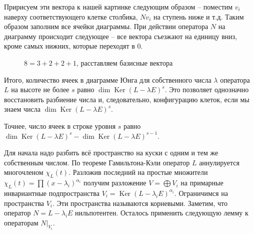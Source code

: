 \documentclass[10pt,a4paper,oneside]{book}
\theoremstyle{definition}
\DeclareMathOperator{\Ker}{Ker}
\begin{document}
 Пририсуем эти вектора к нашей картинке следующим образом -- поместим $v_i$ наверху соответствующего клетке  столбика, $N v_i$ на ступень ниже и т.д. Таким образом заполним все ячейки диаграммы. При действии оператора $N$ на диаграмму происходит следующее -- все вектора съезжают на единицу вниз, кроме самых нижних, которые переходят в $0$.
\begin{figure}[hhh]
\begin{center}
\end{center}
\caption{$8=3+2+2+1$, расставляем базисные вектора}
\end{figure}
Итого, количество ячеек в диаграмме Юнга для собственного числа $\lambda$ оператора $L$ на высоте не более $s$ равно $\dim \Ker(L - \lambda E)^s $.
Это  позволяет однозначно восстановить разбиение числа и, следовательно, конфигурацию клеток, если мы знаем числа $\dim \Ker(L - \lambda E)^s $.

Точнее, число ячеек в строке уровня $s$ равно $\dim \Ker(L - \lambda E)^s -\dim \Ker(L - \lambda E)^{s-1} $.







\proof[Существование]


Для начала надо разбить всё пространство на куски с одним и тем же собственным числом. По теореме Гамильтона-Кэли оператор $L$ аннулируется многочленом $\chi_L(t)$. Разложив последний на простые множители $\chi_L(t)=\prod (x-\lambda_i)^{\alpha_i}$ получим разложение $V=\bigoplus V_i$ на примарные инвариантные подпространства $V_i=\Ker (L-\lambda_i E)^{\alpha_i}$. Ограничимся на пространства $V_i$. Эти пространства называются корневыми. Заметим, что оператор $N=L-\lambda_i E$ нильпотентен. Осталось применить следующую  лемму к операторам $N|_{V_i}$.
\end{document}
